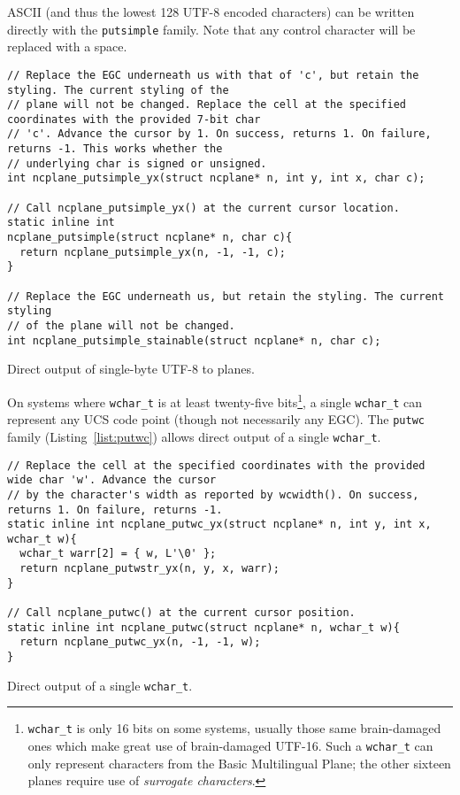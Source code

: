 ASCII (and thus the lowest 128 UTF-8 encoded characters) can be written directly
with the \texttt{putsimple} family. Note that any control character will be replaced with
a space.

\begin{listing}[!htb]
\begin{verbatim}
// Replace the EGC underneath us with that of 'c', but retain the styling. The current styling of the
// plane will not be changed. Replace the cell at the specified coordinates with the provided 7-bit char
// 'c'. Advance the cursor by 1. On success, returns 1. On failure, returns -1. This works whether the
// underlying char is signed or unsigned.
int ncplane_putsimple_yx(struct ncplane* n, int y, int x, char c);

// Call ncplane_putsimple_yx() at the current cursor location.
static inline int
ncplane_putsimple(struct ncplane* n, char c){
  return ncplane_putsimple_yx(n, -1, -1, c);
}

// Replace the EGC underneath us, but retain the styling. The current styling
// of the plane will not be changed.
int ncplane_putsimple_stainable(struct ncplane* n, char c);
\end{verbatim}
\caption{Direct output of single-byte UTF-8 to planes.}
\label{list:putc}
\end{listing}

On systems where \texttt{wchar\_t} is at least twenty-five bits\footnote{\texttt{wchar\_t}
  is only 16 bits on some systems, usually those same brain-damaged ones which
  make great use of brain-damaged UTF-16. Such a \texttt{wchar\_t} can only
represent characters from the Basic Multilingual Plane; the other sixteen planes
require use of \textit{surrogate characters}.}, a single \texttt{wchar\_t} can
represent any UCS code point (though not necessarily any EGC). The
\texttt{putwc} family (Listing~\ref{list:putwc}) allows direct output of a single \texttt{wchar\_t}.

\begin{listing}[!htb]
\begin{verbatim}
// Replace the cell at the specified coordinates with the provided wide char 'w'. Advance the cursor
// by the character's width as reported by wcwidth(). On success, returns 1. On failure, returns -1.
static inline int ncplane_putwc_yx(struct ncplane* n, int y, int x, wchar_t w){
  wchar_t warr[2] = { w, L'\0' };
  return ncplane_putwstr_yx(n, y, x, warr);
}

// Call ncplane_putwc() at the current cursor position.
static inline int ncplane_putwc(struct ncplane* n, wchar_t w){
  return ncplane_putwc_yx(n, -1, -1, w);
}
\end{verbatim}
\caption{Direct output of a single \texttt{wchar\_t}.}
\label{list:putwc}
\end{listing}

